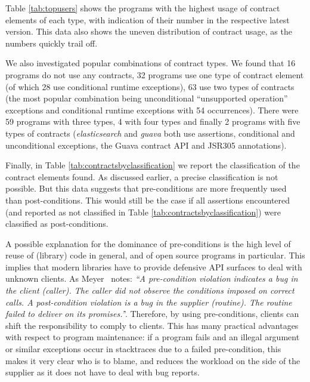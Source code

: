 \documentclass[a4paper,UKenglish]{lipics-v2016}
\begin{document}
Table \ref{tab:topusers} shows the programs with the highest usage of contract elements of each type, with indication of their number in the respective latest version. This data also shows the uneven distribution of contract usage, as the numbers quickly trail off. 






We also investigated popular combinations of contract types. We found that 16 programs do not use any contracts, 32 programs use one type of contract element (of which 28 use conditional runtime exceptions), 63 use two types of contracts (the most popular combination being unconditional ``unsupported operation'' exceptions and conditional runtime exceptions with 54 occurrences). There were 59 programs with three types, 4 with four types and finally 2 programs with five types of contracts (\textit{elasticsearch} and \textit{guava} both use assertions, conditional and unconditional exceptions, the Guava contract API and JSR305 annotations).

Finally, in Table \ref{tab:contractsbyclassification} we report the classification of the contract elements found. As discussed earlier, a precise classification is not possible. But this data suggests that pre-conditions are more frequently used than post-conditions. This would still be the case if all assertions encountered (and reported as not classified in Table \ref{tab:contractsbyclassification}) were classified as post-conditions.


A possible explanation for the dominance of pre-conditions is the high level of reuse of (library) code in general, and of open source programs in particular. This implies that modern libraries have to provide defensive API surfaces to deal with unknown clients. As Meyer~\cite{meyer1992applying} notes: \textit{``A pre-condition violation indicates a bug in the client (caller). The caller did not observe the conditions imposed on correct calls. A post-condition violation is a bug in the supplier (routine). The routine failed to deliver on its promises.'}'.  Therefore, by using pre-conditions, clients can shift the responsibility to comply to clients. This has many practical advantages with respect to program maintenance: if a program fails and an illegal argument or similar exceptions occur in stacktraces due to a failed pre-condition, this makes it very clear who is to blame, and reduces the workload on the side of the supplier as it does not have to deal with bug reports. 
\end{document}
